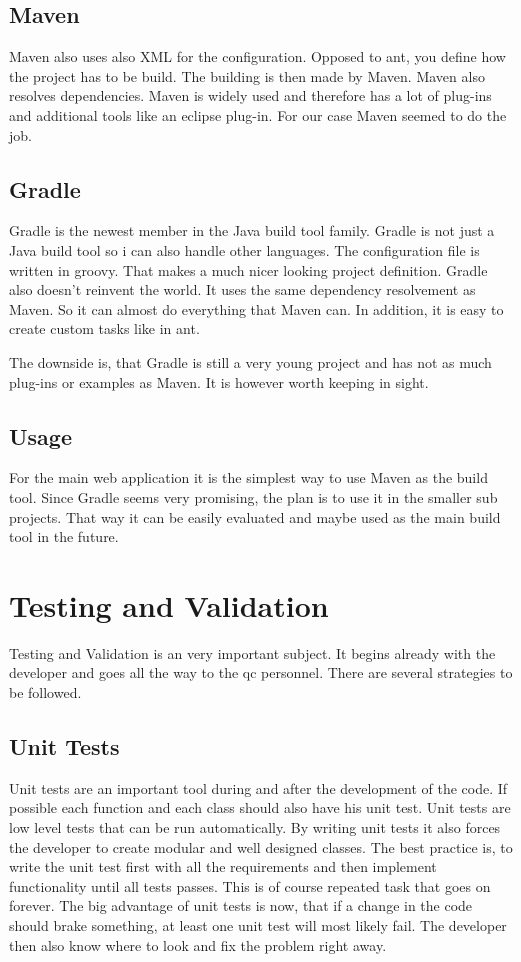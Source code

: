 \documentclass[paper=a4,twoside=false,BCOR=0mm,DIV=calc,fontsize=12pt]{scrartcl}
\begin{document}
\subsection{Maven}
Maven also uses also XML for the configuration. Opposed to ant, you define how the project has to be build. The building is then
made by Maven. Maven also resolves dependencies. Maven is widely used and therefore has a lot of plug-ins and additional tools like an eclipse plug-in. For our case Maven seemed to do the job.


\subsection{Gradle}
Gradle is the newest member in the Java build tool family. Gradle is not just a Java build tool so i can also handle other languages. The configuration file is written in groovy. That makes a much nicer looking project definition.
Gradle also doesn't reinvent the world. It uses the same dependency resolvement as Maven. So it can almost do everything that Maven can. In addition, it is easy to create custom tasks like in ant.

The downside is, that Gradle is still a very young project and has not as much plug-ins or examples as Maven. It is however worth keeping in sight.

\subsection{Usage}
For the main web application it is the simplest way to use Maven as the build tool. Since Gradle seems very promising, the plan is to use it in the
smaller sub projects. That way it can be easily evaluated and maybe used as the main build tool in the future.


\section{Testing and Validation}
Testing and Validation is an very important subject. It begins already with the developer and goes all the way to the qc personnel.
There are several strategies to be followed.

\subsection{Unit Tests}
Unit tests are an important tool during and after the development of the code. If possible each function and each class should also have his unit test. 
Unit tests are low level tests that can be run automatically. By writing unit tests it also forces the developer to create modular and well designed classes.
The best practice is, to write the unit test first with all the requirements and then implement functionality until all tests passes. This is of course repeated task 
that goes on forever.
The big advantage of unit tests is now, that if a change in the code should brake something, at least one unit test will most likely fail.
The developer then also know where to look and fix the problem right away.
\end{document}
